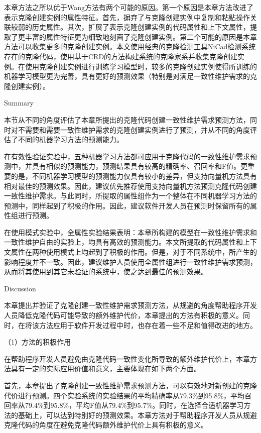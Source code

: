 本章方法之所以优于Wang方法有两个可能的原因。第一个原因是本章方法改进了表示克隆创建实例的属性特征。首先，摒弃了与克隆创建实例中复制和粘贴操作关联较弱的历史属性。其次，扩展了表示克隆创建实例的代码属性和上下文属性，提取了更丰富的属性特征更为细致地刻画了克隆创建实例。第二个可能的原因是本章方法可以收集更多的克隆创建实例。本文使用经典的克隆检测工具NiCad检测系统存在的克隆代码，使用基于CRD的方法构建系统的克隆家系并收集克隆创建实例。在使用克隆创建实例进行训练学习模型时，较多的克隆创建实例使得所训练的机器学习模型更为完善，具有更好的预测效果（特别是对满足一致性维护需求的克隆创建实例）。

{Summary}

本节从不同的角度评估了本章所提出的克隆代码创建一致性维护需求预测方法，同时对不需要和需要一致性维护需求的克隆创建实例进行了预测，并从不同的角度评估了不同的机器学习方法的预测能力。

在有效性验证实验中，五种机器学习方法都可应用于克隆代码的一致性维护需求预测中，并具有相似的预测能力，预测结果具有较高的精确率、召回率和F值。更重要的是，不同机器学习模型的预测能力仅具有较小的差异，但支持向量机方法具有相对最佳的预测效果。因此，建议优先推荐使用支持向量机方法预测克隆代码创建一致性维护需求。与此同时，所提取的属性组作为一个整体在不同机器学习方法的预测中，同样起到了积极的作用。因此，建议软件开发人员在预测时保留所有的属性组进行预测。

在使用模式实验中，全属性实验结果表明：本章所构建的模型在一致性维护需求和一致性维护自由的实验上，均具有高效的预测能力。本文所提取的代码属性和上下文属性在两种使用模式上均起到了积极的作用。但是，对于不同系统中，所产生的影响程度并不一致。因此，建议维护人员使用全属性组进行一致性维护需求预测，从而将其使用到其它未验证的系统中，使之达到最佳的预测效果。

{Discussion}

本章提出并验证了克隆创建一致性维护需求预测方法，从规避的角度帮助程序开发人员降低克隆代码可能导致的额外维护代价，本章提出的方法有积极的意义。同时，在将该方法应用于软件开发过程中时，也存在着一些不足和值得改进的地方。

（1）方法的积极作用

在帮助程序开发人员避免由克隆代码一致性变化所导致的额外维护代价上，本章方法具有一定的实际应用价值和意义，主要体现在如下两个方面。

首先，本章提出了克隆创建一致性维护需求预测方法，可以有效地对新创建的克隆代价进行预测。四个实验系统的实验结果的平均精确率从79.3\%到95.8\%，平均召回率从79.4\%到95.8\%，平均F值从79.4\%到95.7\%。同时，在选择合适机器学习方法的基础上，可以达到特别好的预测效果。本章方法对于帮助程序开发人员从规避克隆代码的角度在避免克隆代码额外维护代价上具有积极的意义。

